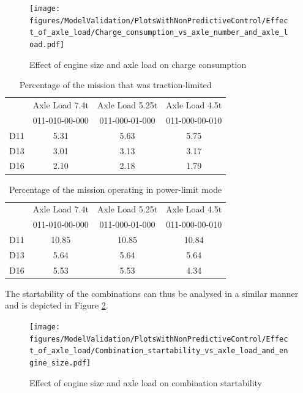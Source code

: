 \documentclass[ExampleMasters.tex]{subfiles}
\begin{document}
\begin{figure}[h!]
\centering
\texttt{[image: figures/ModelValidation/PlotsWithNonPredictiveControl/Effect\_of\_axle\_load/Charge\_consumption\_vs\_axle\_number\_and\_axle\_load.pdf]}
\caption{Effect of engine size and axle load on charge consumption}
\label{chargeEngineSizeAxleLoad}
\end{figure}
\begin{table}[h!]
\centering
\begin{tabular}{|c|c|c|c|}
\hline
& Axle Load 7.4t & Axle Load 5.25t & Axle Load 4.5t \\
& 011-010-00-000 & 011-000-01-000 & 011-000-00-010 \\
\hline
D11 & 5.31 & 5.63 & 5.75 \\
\hline
D13 & 3.01 & 3.13 & 3.17 \\
\hline
D16 & 2.10 & 2.18 & 1.79 \\
\hline
\end{tabular}
\caption{Percentage of the mission that was traction-limited}
\label{table:tractionLimitMode}
\end{table}
\begin{table}[h!]
\centering
\begin{tabular}{|c|c|c|c|}
\hline
& Axle Load 7.4t & Axle Load 5.25t & Axle Load 4.5t \\
& 011-010-00-000 & 011-000-01-000 & 011-000-00-010 \\
\hline
D11 & 10.85 & 10.85 & 10.84 \\
\hline
D13 & 5.64 & 5.64 & 5.64 \\
\hline
D16 & 5.53 & 5.53 & 4.34 \\
\hline
\end{tabular}
\caption{Percentage of the mission operating in power-limit mode}
\label{table:powerLimitMode}
\end{table}
The startability of the combinations can thus be analysed in a similar manner and is depicted in Figure \ref{startabilityEngineAxleLoad}.\\
\begin{figure}[h!]
\centering
\texttt{[image: figures/ModelValidation/PlotsWithNonPredictiveControl/Effect\_of\_axle\_load/Combination\_startability\_vs\_axle\_load\_and\_engine\_size.pdf]}
\caption{Effect of engine size and axle load on combination startability}
\label{startabilityEngineAxleLoad}
\end{figure}
\end{document}
